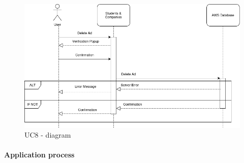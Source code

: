      \begin{figure}[H]
    	\includegraphics[width=\textwidth,height=\textheight,keepaspectratio]{RASD-Latex/assets/Use Case Diagrams/UC8.png}
    	\caption{UC8 - diagram}
    	\label{fig:DataRequest}
    \end{figure}

\paragraph{Application process}


